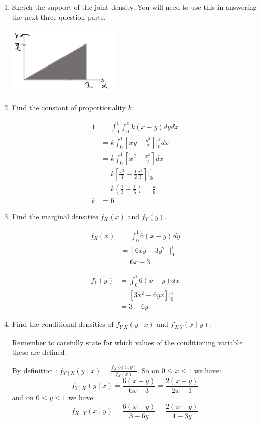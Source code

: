 \documentclass{article}
\newcommand{\1}{\mathbf{1}}
\begin{document}
\begin{enumerate}
    \item Sketch the support of the joint density. You will need to use this in answering the next three question parts.
    
    \begin{center}
    \includegraphics[width=200px]{STATS509/HW4/HW4Figures/picasso4.png}
    \end{center}

    \item Find the constant of proportionality $k$.
    
    \begin{align*}
    1 &= \int_0^1\int_0^x k(x-y)dydx\\
      &= k \int_0^1 \left[xy - \frac{y^2}{2}\right]\bigg |_0^x dx \\
      &= k \int_0^1 \left[x^2 - \frac{x^2}{2}\right] dx \\
      &= k \left[ \frac{x^3}{3} - \frac{1}{2}\frac{x^3}{3} \right] \bigg |_0^1 \\
      &= k \left( \frac{1}{3} - \frac{1}{6}\right) = \frac{k}{6}\\
    k &= 6
    \end{align*}

    \item Find the marginal densities $f_X(x)$ and $f_Y(y)$.
    
    \begin{align*}
    f_X(x) &= \int_0^1 6(x-y) dy \\
    &= \left[6xy - 3y^2\right]\bigg|_0^1 \\
    &= 6x-3
    \end{align*}
    
    \begin{align*}
    f_Y(y) &= \int_0^1 6(x-y) dx \\
    &= \left[3x^2 - 6yx\right]\bigg|_0^1 \\
    &= 3 - 6y
    \end{align*}

    \newpage
    \item Find the conditional densities of $f_{Y|X}(y\mid x)$ and $f_{X|Y}(x\mid y)$.\par
    Remember to carefully state for which values of the conditioning variable these are defined.
    
    By definition : $f_{Y\mid X}(y \mid x) = \frac{f_{X, Y}(x, y)}{f_X(x)}$. So on $0\leq x \leq 1$ we have:
    $$ f_{Y\mid X}(y \mid x) = \frac{6(x-y)}{6x-3} = \frac{2(x-y)}{2x-1} $$
    and on $0\leq y\leq 1 $ we have:
    $$ f_{X\mid Y}(x \mid y) = \frac{6(x-y)}{3-6y} = \frac{2(x-y)}{1-3y} $$
   
\end{enumerate}
\end{document}
